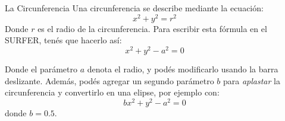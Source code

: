 \begin{surferPage}{La Circunferencia}
Una circunferencia se describe mediante la ecuaci{\'o}n:
\[x^2+y^2=r^2\]
Donde $r$ es el radio de la circunferencia. 
Para escribir esta f{\'o}rmula en el SURFER, tenés que hacerlo as{\'i}:
\[x^2+y^2-a^2=0\]

Donde el par{\'a}metro $a$ denota el radio, y pod{\'e}s modificarlo usando la barra deslizante. Además, pod{\'e}s agregar un segundo par{\'a}metro $b$ para {\it aplastar} la circunferencia y convertirlo en una elipse, por ejemplo con:
\[bx^2+y^2-a^2=0\] donde $b=0.5$.
\end{surferPage}
